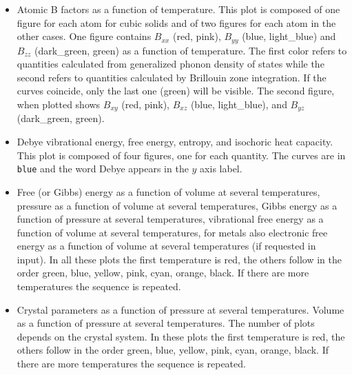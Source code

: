 \documentclass[12pt,a4paper,twoside]{report}
\begin{document}
\begin{itemize}
\item
Atomic B factors as a function of temperature. This plot is composed of 
one figure for each atom for cubic solids and of two figures for each atom
in the other cases. One figure contains $B_{xx}$ (red, pink), $B_{yy}$ 
(blue, light\_blue) and $B_{zz}$ (dark\_green, green) as a function of 
temperature. The first color refers to quantities calculated from 
generalized phonon density of states while the second refers to quantities 
calculated by Brillouin zone integration.
If the curves coincide, only the last one (green) will be visible. The second 
figure, when plotted shows $B_{xy}$ (red, pink), $B_{xz}$ (blue, light\_blue), 
and $B_{yz}$ (dark\_green, green).

\item
Debye vibrational energy, free energy, 
entropy, and isochoric heat capacity. This plot is composed of four 
figures, one for each quantity. The curves are in \texttt{blue}
and the word Debye appears in the $y$ axis label.

\item
Free (or Gibbs) energy as a function of volume at several temperatures,
pressure as a function of volume at several temperatures, Gibbs
energy as a function of pressure at several temperatures,
vibrational free energy as a function of volume at several temperatures,
for metals also electronic free energy as a function of volume at several
temperatures (if requested in input). In all these plots the first
temperature is red, the others follow in the order green, blue, yellow, 
pink, cyan, orange, black. If there are more temperatures the sequence is 
repeated.

\item Crystal parameters as a function of pressure at several temperatures.
Volume as a function of pressure at several temperatures.
The number of plots depends on the crystal system.
In these plots the first temperature is red, the others follow in the 
order green, blue, yellow, pink, cyan, orange, black.
If there are more temperatures the sequence is 
repeated.


\end{itemize}
\end{document}
